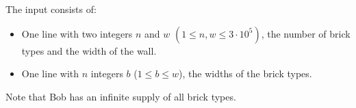 
    The input consists of:
    \begin{itemize}
        \item One line with two integers $n$ and $w$ $(1\leq n,w\leq3\cdot10^5)$, the number of brick types and the width of the wall.
        \item One line with $n$ integers $b$ ($1\leq b\leq w$), the widths of the brick types.
    \end{itemize}
        Note that Bob has an infinite supply of all brick types.
